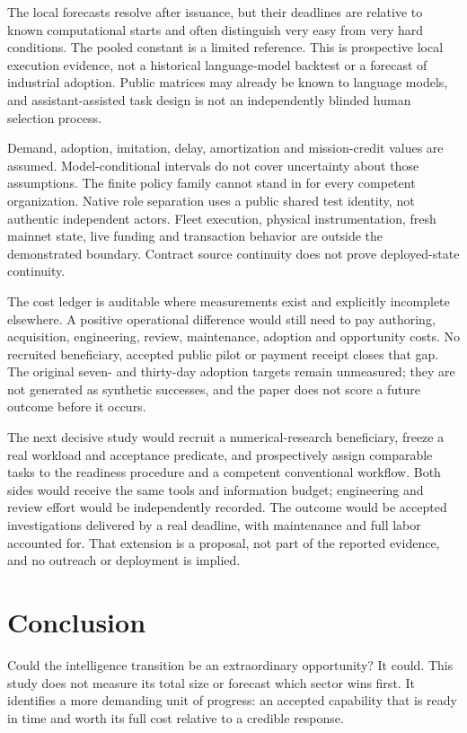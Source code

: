 The local forecasts resolve after issuance, but their deadlines are relative to known computational starts and often distinguish very easy from very hard conditions. The pooled constant is a limited reference. This is prospective local execution evidence, not a historical language-model backtest or a forecast of industrial adoption. Public matrices may already be known to language models, and assistant-assisted task design is not an independently blinded human selection process.

Demand, adoption, imitation, delay, amortization and mission-credit values are assumed. Model-conditional intervals do not cover uncertainty about those assumptions. The finite policy family cannot stand in for every competent organization. Native role separation uses a public shared test identity, not authentic independent actors. Fleet execution, physical instrumentation, fresh mainnet state, live funding and transaction behavior are outside the demonstrated boundary. Contract source continuity does not prove deployed-state continuity.

The cost ledger is auditable where measurements exist and explicitly incomplete elsewhere. A positive operational difference would still need to pay authoring, acquisition, engineering, review, maintenance, adoption and opportunity costs. No recruited beneficiary, accepted public pilot or payment receipt closes that gap. The original seven- and thirty-day adoption targets remain unmeasured; they are not generated as synthetic successes, and the paper does not score a future outcome before it occurs.

The next decisive study would recruit a numerical-research beneficiary, freeze a real workload and acceptance predicate, and prospectively assign comparable tasks to the readiness procedure and a competent conventional workflow. Both sides would receive the same tools and information budget; engineering and review effort would be independently recorded. The outcome would be accepted investigations delivered by a real deadline, with maintenance and full labor accounted for. That extension is a proposal, not part of the reported evidence, and no outreach or deployment is implied.

\section{Conclusion}
Could the intelligence transition be an extraordinary opportunity? It could. This study does not measure its total size or forecast which sector wins first. It identifies a more demanding unit of progress: an accepted capability that is ready in time and worth its full cost relative to a credible response.

